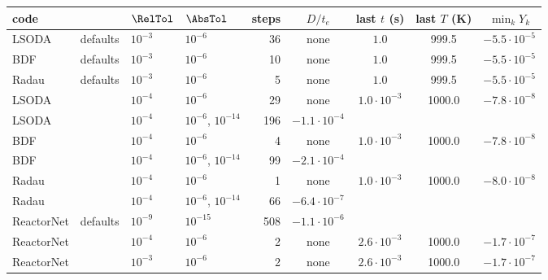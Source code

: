 \begin{tabular}{llllrcccc}
\toprule
code & & $\RelTol$ & $\AbsTol$ & steps & $D/t_e$ & last $t$ (s) & last $T$ (K) & $\min_kY_k$\\
\midrule
LSODA & defaults & $10^{-3}$ & $10^{-6}$ & 36 & none & $1.0$ & 999.5 & $-5.5\cdot10^{-5}$\\
BDF & defaults & $10^{-3}$ & $10^{-6}$ & 10 & none & $1.0$ & 999.5 & $-5.5\cdot10^{-5}$\\
Radau & defaults & $10^{-3}$ & $10^{-6}$ & 5 & none & $1.0$ & 999.5 & $-5.5\cdot10^{-5}$\\
LSODA &  & $10^{-4}$ & $10^{-6}$ & 29 & none & $1.0\cdot10^{-3}$ & 1000.0 & $-7.8\cdot10^{-8}$\\
LSODA &  & $10^{-4}$ & $10^{-6}$, $10^{-14}$ & 196 & $-1.1\cdot10^{-4}$ & & & \\
BDF &  & $10^{-4}$ & $10^{-6}$ & 4 & none & $1.0\cdot10^{-3}$ & 1000.0 & $-7.8\cdot10^{-8}$\\
BDF &  & $10^{-4}$ & $10^{-6}$, $10^{-14}$ & 99 & $-2.1\cdot10^{-4}$ & & & \\
Radau &  & $10^{-4}$ & $10^{-6}$ & 1 & none & $1.0\cdot10^{-3}$ & 1000.0 & $-8.0\cdot10^{-8}$\\
Radau &  & $10^{-4}$ & $10^{-6}$, $10^{-14}$ & 66 & $-6.4\cdot10^{-7}$ & & & \\
ReactorNet & defaults & $10^{-9}$ & $10^{-15}$ & 508 & $-1.1\cdot10^{-6}$ & & & \\
ReactorNet &  & $10^{-4}$ & $10^{-6}$ & 2 & none & $2.6\cdot10^{-3}$ & 1000.0 & $-1.7\cdot10^{-7}$\\
ReactorNet &  & $10^{-3}$ & $10^{-6}$ & 2 & none & $2.6\cdot10^{-3}$ & 1000.0 & $-1.7\cdot10^{-7}$\\
\bottomrule
\end{tabular}
